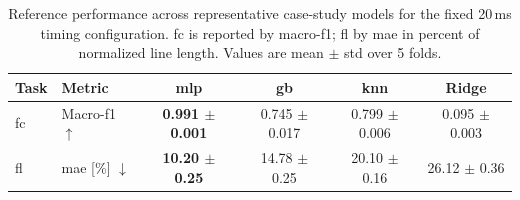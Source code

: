 \begin{table}[ht]
\caption{Reference performance across representative case-study models for the fixed 20\,ms timing configuration. \ac{fc} is reported by macro-\ac{f1}; \ac{fl} by \ac{mae} in percent of normalized line length. Values are mean $\pm$ std over 5 folds.}
\small
\label{tab:reference_20ms}
\centering
\begin{tabular}{llcccc}
\toprule
\bfseries Task & \bfseries Metric & \bfseries \acs{mlp} & \bfseries \ac{gb} & \bfseries \ac{knn} & \bfseries Ridge \\
\midrule
\ac{fc} & Macro-\ac{f1} $\uparrow$ & \textbf{0.991 $\pm$ 0.001} & 0.745 $\pm$ 0.017 & 0.799 $\pm$ 0.006 & 0.095 $\pm$ 0.003 \\
\ac{fl} & \ac{mae} [\%] $\downarrow$ & \textbf{10.20 $\pm$ 0.25} & 14.78 $\pm$ 0.25 & 20.10 $\pm$ 0.16 & 26.12 $\pm$ 0.36 \\
\bottomrule
\end{tabular}
\end{table}
